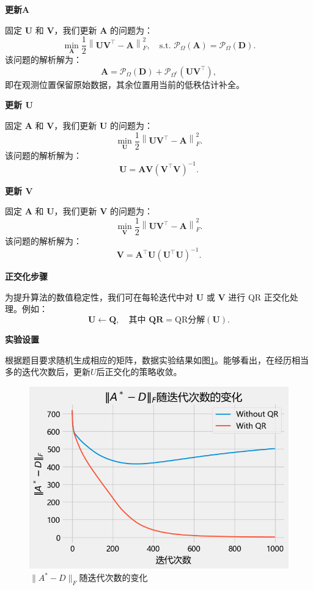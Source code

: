 \documentclass{homework}
\begin{document}
\question

\begin{sol}

\textbf{更新$\bm{A}$}

固定 $\bm{U}$ 和 $\bm{V}$，我们更新 $\bm{A}$ 的问题为：
\[
\min_{\bm{A}} \frac{1}{2} \left\| \bm{U}\bm{V}^\top - \bm{A} \right\|_F^2, \quad \text{s.t. } \mathcal{P}_\Omega(\bm{A}) = \mathcal{P}_\Omega(\bm{D}).
\]
该问题的解析解为：
\[
\bm{A} = \mathcal{P}_\Omega(\bm{D}) + \mathcal{P}_{\Omega^c}(\bm{U}\bm{V}^\top),
\]
即在观测位置保留原始数据，其余位置用当前的低秩估计补全。

\textbf{更新 $\bm{U}$}

固定 $\bm{A}$ 和 $\bm{V}$，我们更新 $\bm{U}$ 的问题为：
\[
\min_{\bm{U}} \frac{1}{2} \left\| \bm{U}\bm{V}^\top - \bm{A} \right\|_F^2.
\]
该问题的解析解为：
\[
\bm{U} = \bm{A} \bm{V} (\bm{V}^\top \bm{V})^{-1}.
\]

\textbf{更新 $\bm{V}$}

固定 $\bm{A}$ 和 $\bm{U}$，我们更新 $\bm{V}$ 的问题为：
\[
\min_{\bm{V}} \frac{1}{2} \left\| \bm{U}\bm{V}^\top - \bm{A} \right\|_F^2.
\]
该问题的解析解为：
\[
\bm{V} = \bm{A}^\top \bm{U} (\bm{U}^\top \bm{U})^{-1}.
\]

\textbf{正交化步骤}

为提升算法的数值稳定性，我们可在每轮迭代中对 $\bm{U}$ 或 $\bm{V}$ 进行 QR 正交化处理。例如：
\[
\bm{U} \leftarrow \bm{Q}, \quad \text{其中 } \bm{Q}\bm{R} = \text{QR分解}(\bm{U}).
\]

\textbf{实验设置}

根据题目要求随机生成相应的矩阵，数据实验结果如图\ref{fig:3}。能够看出，在经历相当多的迭代次数后，更新$U$后正交化的策略收敛。

\begin{figure}[h]
    \centering
    \includegraphics[width=0.5\linewidth]{3.png}
    \caption{$ \|A^* - D\|_F $随迭代次数的变化}
    \label{fig:3}
\end{figure}
\end{sol}

\question
\end{document}
